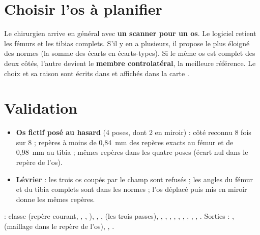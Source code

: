 \section{Choisir l'os à planifier}

Le chirurgien arrive en général avec \textbf{un scanner pour un os}. Le logiciel retient les fémurs et les tibias
complets. S'il y en a plusieurs, il propose le plus éloigné des normes (la somme des écarts en écarts-types). Si le
même os est complet des deux côtés, l'autre devient le \textbf{membre controlatéral}, la meilleure référence. Le choix
et sa raison sont écrits dans  et affichés dans la carte .

\section{Validation}

\begin{itemize}
  \item \textbf{Os fictif posé au hasard} (4 poses, dont 2 en miroir) : côté reconnu 8 fois sur 8 ; repères à moins de
  0,84~mm des repères exacts au fémur et de 0,98~mm au tibia ; mêmes repères dans les quatre poses (écart nul dans le
  repère de l'os).
  \item \textbf{Lévrier} : les trois os coupés par le champ sont refusés ; les angles du fémur et du tibia complets
  sont dans les normes ; l'os déplacé puis mis en miroir donne les mêmes repères.
\end{itemize}

\begin{danslecode}
 : classe  (repère courant, , ,
), , ,  (les trois passes),
, , , ,
, , , , ,
. Sorties : ,  (maillage dans le repère de l'os),
, .
\end{danslecode}
